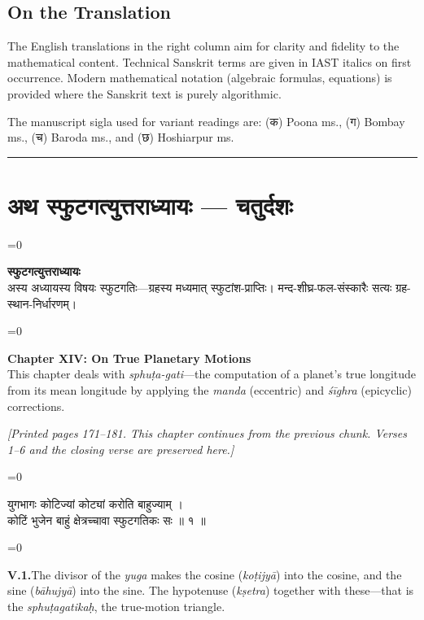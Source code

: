 \documentclass[11pt,a4paper]{article}
\newcommand{\longline}{\noindent\rule{\textwidth}{0.4pt}}
\newcommand{\cnote}[1]{\textcolor{notecolor}{\textit{#1}}}
\newcommand{\dev}[1]{{\devanagarifont\color{sktcolor}#1}}
\newcommand{\dsec}[1]{\section*{\dev{#1}}}
\newcommand{\iast}[1]{\textit{#1}}
\newenvironment{paracol}[1]{\begingroup}{\endgroup}
\newcommand{\switchcolumn}[1][]{%
  \ifnum#1=0\relax\else\par\nobreak\vspace{0.5em}\par\nobreak\fi%
}
\begin{document}
\subsection*{On the Translation}

The English translations in the right column aim for clarity and
fidelity to the mathematical content. Technical Sanskrit terms are
given in IAST italics on first occurrence. Modern mathematical
notation (algebraic formulas, equations) is provided where the
Sanskrit text is purely algorithmic.

The manuscript sigla used for variant readings are: (क) Poona ms.,
(ग) Bombay ms., (च) Baroda ms., and (छ) Hoshiarpur ms.

\longline

\newpage

\dsec{अथ स्फुटगत्युत्तराध्यायः — चतुर्दशः}

\begin{paracol}{2}
\switchcolumn[0]
\dev{%
\textbf{स्फुटगत्युत्तराध्यायः}\\[0.2cm]
अस्य अध्यायस्य विषयः स्फुटगतिः—ग्रहस्य मध्यमात्
स्फुटांश-प्राप्तिः। मन्द-शीघ्र-फल-संस्कारैः सत्यः
ग्रह-स्थान-निर्धारणम्।
}

\switchcolumn[1]
\textbf{Chapter XIV: On True Planetary Motions}\\[0.2cm]
This chapter deals with \iast{sphuṭa-gati}—the computation of a
planet's true longitude from its mean longitude by applying the
\iast{manda} (eccentric) and \iast{śīghra} (epicyclic) corrections.
\end{paracol}

\vspace{0.3cm}
\cnote{[Printed pages 171–181. This chapter continues from the previous
chunk. Verses 1–6 and the closing verse are preserved here.]}
\vspace{0.3cm}

\begin{paracol}{2}
\switchcolumn[0]
\dev{%
युगभागः कोटिज्यां कोट्यां करोति बाहुज्याम् ।\\
कोटिं भुजेन बाहुं क्षेत्रच्चावा स्फुटगतिकः सः ॥ १ ॥
}

\switchcolumn[1]
\textbf{V.1.}\quad The divisor of the \iast{yuga} makes the cosine
(\iast{koṭijyā}) into the cosine, and the sine (\iast{bāhujyā}) into
the sine. The hypotenuse (\iast{kṣetra}) together with these—that is
the \iast{sphuṭagatikaḥ}, the true-motion triangle.
\end{paracol}
\end{document}
